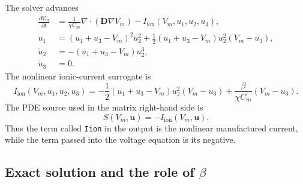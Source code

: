 \documentclass[11pt,a4paper]{article}
\newcommand{\code}[1]{\texttt{\small #1}}
\newcommand{\Vm}{V_m}
\newcommand{\Iion}{I_{\mathrm{ion}}}
\newcommand{\Dten}{\mathbf{D}}
\newcommand{\grad}{\nabla}
\newcommand{\divg}{\nabla\!\cdot}
\begin{document}
The solver advances
\begin{align}
  \frac{\partial \Vm}{\partial t}
  &=
  \frac{1}{\chi C_m}\divg(\Dten\grad\Vm)
  - \Iion(\Vm,u_1,u_2,u_3),
  \label{eq:mms-pde}\\
  \dot u_1
  &=
  (u_1+u_3-\Vm)^2 u_2^2
  + \frac{1}{2}(u_1+u_3-\Vm)u_2^2(\Vm-u_3),
  \label{eq:mms-u1}\\
  \dot u_2
  &=
  -(u_1+u_3-\Vm)u_2^3,
  \label{eq:mms-u2}\\
  \dot u_3 &= 0.
  \label{eq:mms-u3}
\end{align}
The nonlinear ionic-current surrogate is
\begin{equation}
  \Iion(\Vm,u_1,u_2,u_3)
  =
  -\frac{1}{2}(u_1+u_3-\Vm)u_2^2(\Vm-u_3)
  + \frac{\beta}{\chi C_m}(\Vm-u_3).
  \label{eq:mms-iion}
\end{equation}
The PDE source used in the matrix right-hand side is
\begin{equation}
  S(\Vm,\mathbf{u})=-\Iion(\Vm,\mathbf{u}).
  \label{eq:mms-source}
\end{equation}
Thus the term called \code{Iion} in the output is the nonlinear manufactured
current, while the term passed into the voltage equation is its negative.

\subsection{Exact solution and the role of \texorpdfstring{$\beta$}{beta}}
\end{document}
